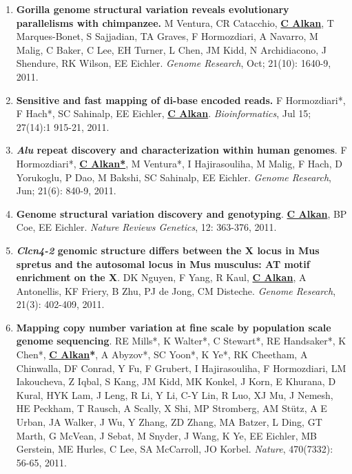 \begin{enumerate}
\item
{\bf Gorilla genome structural variation reveals evolutionary parallelisms with chimpanzee.}
M Ventura, CR Catacchio, {\bf {\underline {C Alkan}}}, T Marques-Bonet, S Sajjadian, TA Graves, F Hormozdiari, A Navarro, 
M Malig, C Baker, C Lee, EH Turner, L Chen, JM Kidd, N Archidiacono, J Shendure, RK Wilson, EE Eichler.
{\em Genome Research}, Oct;  21(10): 1640-9, 2011.


\item
{\bf Sensitive and fast mapping of di-base encoded reads.}
F Hormozdiari*, F Hach*, SC Sahinalp, EE Eichler, {\bf {\underline {C Alkan}}}.
{\em Bioinformatics}, Jul 15;  27(14):1 915-21, 2011.



\item
{\bf \textit {Alu} repeat discovery and characterization within human genomes}.
F Hormozdiari*, {\bf {\underline {C Alkan*}}}, M Ventura*, I Hajirasouliha, M Malig, 
F Hach, D Yorukoglu, P Dao, M Bakshi, SC Sahinalp, EE Eichler.
{\em Genome Research}, Jun;  21(6): 840-9, 2011.

\item
{\bf Genome structural variation discovery and genotyping}. 
{\bf {\underline {C Alkan}}}, BP Coe, EE Eichler.
{\em Nature Reviews Genetics}, 12: 363-376, 2011.


\item
{\bf {\em Clcn4-2} genomic structure differs between the X locus in Mus spretus and the autosomal 
locus in Mus musculus: AT motif enrichment on the X}.  
DK Nguyen, F Yang, R Kaul, {\bf {\underline {C Alkan}}}, A Antonellis, KF Friery, 
B Zhu, PJ de Jong, CM Disteche. 
{\em Genome Research}, 21(3): 402-409, 2011.


\item
{\bf Mapping copy number variation at fine scale by population scale genome sequencing}.
RE Mills*, K Walter*, C Stewart*, RE Handsaker*, K Chen*, 
{\bf {\underline {C Alkan}*}}, A Abyzov*, SC Yoon*, K Ye*, RK Cheetham, 
A Chinwalla, DF Conrad, Y Fu, F Grubert, I Hajirasouliha, 
F Hormozdiari, LM Iakoucheva, Z Iqbal, S Kang, JM Kidd, 
MK Konkel, J Korn, E Khurana, D Kural, HYK Lam, J Leng, 
R Li, Y Li, C-Y Lin, R Luo, XJ Mu, J Nemesh,
HE Peckham, T Rausch, A Scally, X Shi, MP Stromberg, 
AM St\"{u}tz, A E Urban, JA Walker, J Wu, Y Zhang, 
ZD Zhang, MA Batzer, L Ding, GT Marth, G McVean, 
J Sebat, M Snyder, J Wang, K Ye, EE Eichler, 
MB Gerstein, ME Hurles, C Lee, SA McCarroll,  JO Korbel.
{\em Nature}, 470(7332): 56-65, 2011.


\end{enumerate}
